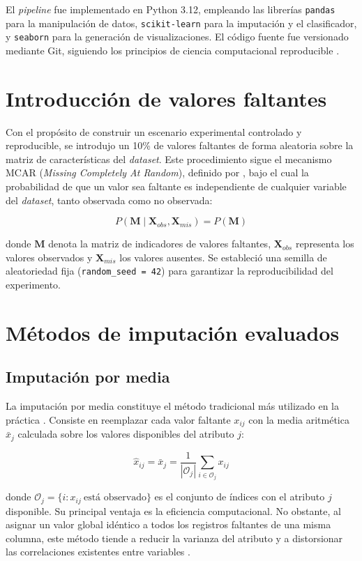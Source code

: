 El \textit{pipeline} fue implementado en Python 3.12, empleando las librerías
\texttt{pandas} \parencite{mckinney2010} para la manipulación de datos,
\texttt{scikit-learn} \parencite{pedregosa2011} para la imputación y el
clasificador, y \texttt{seaborn} para la generación de visualizaciones.
El código fuente fue versionado mediante Git, siguiendo los principios de
ciencia computacional reproducible \parencite{wilson2017}.

\section{Introducción de valores faltantes}

Con el propósito de construir un escenario experimental controlado y
reproducible, se introdujo un 10\% de valores faltantes de forma aleatoria
sobre la matriz de características del \textit{dataset}. Este procedimiento sigue
el mecanismo MCAR (\textit{Missing Completely At Random}), definido por
\textcite{little2019}, bajo el cual la probabilidad de que un valor sea
faltante es independiente de cualquier variable del \textit{dataset}, tanto
observada como no observada:

\[
P(\mathbf{M} \mid \mathbf{X}_{obs}, \mathbf{X}_{mis}) = P(\mathbf{M})
\]

donde $\mathbf{M}$ denota la matriz de indicadores de valores faltantes,
$\mathbf{X}_{obs}$ representa los valores observados y $\mathbf{X}_{mis}$
los valores ausentes. Se estableció una semilla de aleatoriedad fija
(\texttt{random\_seed = 42}) para garantizar la reproducibilidad del
experimento.

\section{Métodos de imputación evaluados}

\subsection{Imputación por media}

La imputación por media constituye el método tradicional más utilizado en
la práctica \parencite{garcia2017}. Consiste en reemplazar cada valor
faltante $x_{ij}$ con la media aritmética $\bar{x}_j$ calculada sobre
los valores disponibles del atributo $j$:

\[
\hat{x}_{ij} = \bar{x}_j = \frac{1}{|\mathcal{O}_j|}
\sum_{i \in \mathcal{O}_j} x_{ij}
\]

donde $\mathcal{O}_j = \{i : x_{ij}\ \text{está observado}\}$ es el
conjunto de índices con el atributo $j$ disponible. Su principal ventaja
es la eficiencia computacional. No obstante, al asignar un valor global
idéntico a todos los registros faltantes de una misma columna, este método
tiende a reducir la varianza del atributo y a distorsionar las correlaciones
existentes entre variables \parencite{little2019}.

